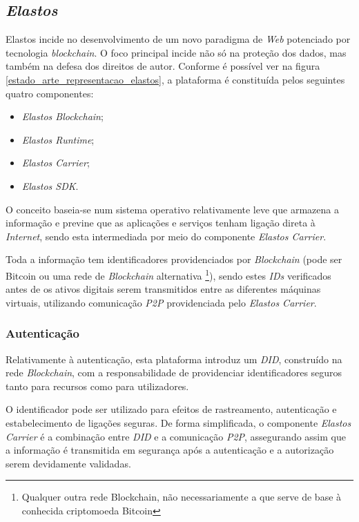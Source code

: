 \subsection{\emph{Elastos}}
Elastos incide no desenvolvimento de um novo paradigma de \emph{Web} potenciado por tecnologia \emph{blockchain}\cite{a_bit_about_blockchain}. O foco principal incide não só na proteção dos dados, mas também na defesa dos direitos de autor. Conforme é possível ver na figura \ref{estado_arte_representacao_elastos}, a plataforma é constituída pelos seguintes quatro componentes\cite{elastos_white_paper}:
\begin{itemize}
	\item \emph{Elastos Blockchain};
	\item \emph{Elastos Runtime};
	\item \emph{Elastos Carrier};
	\item \emph{Elastos SDK}.
\end{itemize}

O conceito baseia-se num sistema operativo relativamente leve que armazena a informação e previne que as aplicações e serviços tenham ligação direta à \emph{Internet}, sendo esta intermediada por meio do componente \emph{Elastos Carrier}. 

Toda a informação tem identificadores providenciados por \emph{Blockchain} (pode ser Bitcoin ou uma rede de \emph{Blockchain} alternativa \footnote{Qualquer outra rede Blockchain, não necessariamente a que serve de base à conhecida criptomoeda Bitcoin}), sendo estes \emph{IDs} verificados antes de os ativos digitais serem transmitidos entre as diferentes máquinas virtuais, utilizando comunicação \emph{\acrfull{P2P}}\cite{what_are_P2P_networks} providenciada pelo \emph{Elastos Carrier}\cite{elastos_developer}.

\subsubsection{Autenticação}

Relativamente à autenticação, esta plataforma introduz um \emph{\acrfull{DID}}, construído na rede \emph{Blockchain}, com a responsabilidade de providenciar identificadores seguros tanto para recursos como para utilizadores.

O identificador pode ser utilizado para efeitos de rastreamento, autenticação e estabelecimento de ligações seguras. De forma simplificada, o componente \emph{Elastos Carrier} é a combinação entre \emph{\acrshort{DID}} e a comunicação \emph{\acrshort{P2P}}, assegurando assim que a informação é transmitida em segurança após a autenticação e a autorização serem devidamente validadas\cite{elastos_white_paper}.

